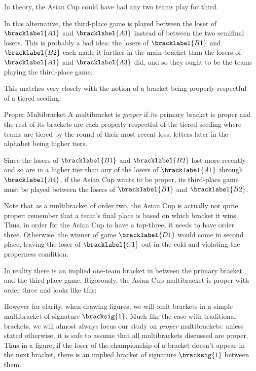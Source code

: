 {    In theory, the Asian Cup could have had any two teams play for third.


    In this alternative, the third-place game is played between the loser of $\bracklabel{A1}$ and $\bracklabel{A3}$ instead of between the two semifinal losers. This is probably a bad idea: the losers of $\bracklabel{B1}$ and $\bracklabel{B2}$ each made it further in the main bracket than the losers of $\bracklabel{A1}$ and $\bracklabel{A3}$ did, and so they ought to be the teams playing the third-place game.

    This matches very closely with the notion of a bracket being properly respectful of a tiered seeding:

    \begin{definition}{Proper Multibracket}{}
        A multibracket is \textit{proper} if its primary bracket is proper and the rest of its brackets are each properly respectful of the tiered seeding where teams are tiered by the round of their most recent loss: letters later in the alphabet being higher tiers.
    \end{definition}

    Since the losers of $\bracklabel{B1}$ and $\bracklabel{B2}$ lost more recently and so are in a higher tier than any of the losers of $\bracklabel{A1}$ through $\bracklabel{A4}$, if the Asian Cup wants to be proper, its third-place game must be played between the losers of $\bracklabel{B1}$ and $\bracklabel{B2}$.

    Note that as a multibracket of order two, the Asian Cup is actually not quite proper: remember that a team's final place is based on which bracket it wins. Thus, in order for the Asian Cup to have a top-three, it needs to have order three. Otherwise, the winner of game $\bracklabel{D1}$ would come in second place, leaving the loser of $\bracklabel{C1}$ out in the cold and violating the properness condition.

    In reality there is an implied one-team bracket in between the primary bracket and the third-place game. Rigorously, the Asian Cup multibracket is proper with order three and looks like this:


    However for clarity, when drawing figures, we will omit brackets in a simple multibracket of signature $\bracksig{1}$. Much like the case with traditional brackets, we will almost always focus our study on \textit{proper} multibrackets: unless stated otherwise, it is safe to assume that all multibrackets discussed are proper. Thus in a figure, if the loser of the championship of a bracket doesn't appear in the next bracket, there is an implied bracket of signature $\bracksig{1}$ between them.

}
